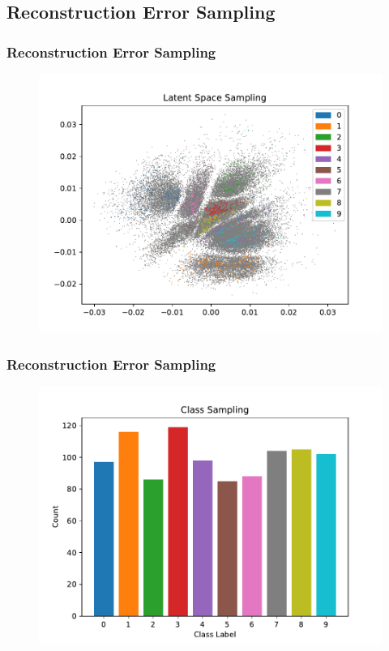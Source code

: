 \documentclass[10pt, usenames, dvipsnames, table]{beamer}
\begin{document}
\subsection{Reconstruction Error Sampling}

\begin{frame}
  \frametitle{Reconstruction Error Sampling}
  \begin{figure}
    \centering
    \includegraphics[width=\linewidth]
    {models/mnist_student_e300_L2_b64/error_sampling_1000}
    \caption{}
    \label{}
  \end{figure}  
\end{frame}

\begin{frame}
  \frametitle{Reconstruction Error Sampling}
  \begin{figure}
    \centering
    \includegraphics[width=\linewidth]
    {models/mnist_student_e300_L2_b64/error_sampling_distribution_1000}
    \caption{}
    \label{}
  \end{figure}  
\end{frame}
\end{document}

